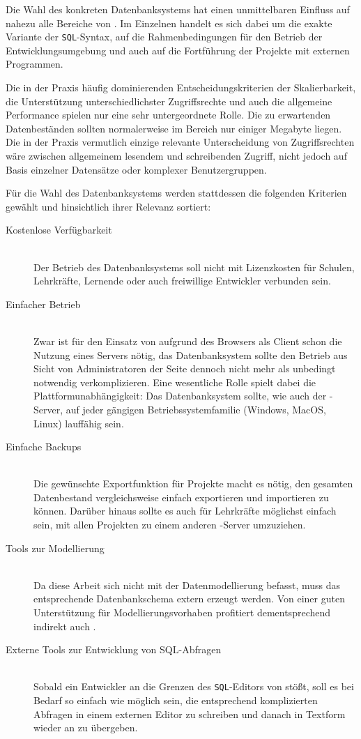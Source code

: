Die Wahl des konkreten Datenbanksystems hat einen unmittelbaren Einfluss auf nahezu alle Bereiche von \idename. Im Einzelnen handelt es sich dabei um die exakte Variante der \texttt{SQL}-Syntax, auf die Rahmenbedingungen für den Betrieb der Entwicklungsumgebung und auch auf die Fortführung der Projekte mit externen Programmen.

Die in der Praxis häufig dominierenden Entscheidungskriterien der Skalierbarkeit, die Unterstützung unterschiedlichster Zugriffsrechte und auch die allgemeine Performance spielen nur eine sehr untergeordnete Rolle. Die zu erwartenden Datenbeständen sollten normalerweise im Bereich nur einiger Megabyte liegen. Die in der Praxis vermutlich einzige relevante Unterscheidung von Zugriffsrechten wäre zwischen allgemeinem lesendem und schreibenden Zugriff, nicht jedoch auf Basis einzelner Datensätze oder komplexer Benutzergruppen.

Für die Wahl des Datenbanksystems werden stattdessen die folgenden Kriterien gewählt und hinsichtlich ihrer Relevanz sortiert:

\begin{description}  
\item[Kostenlose Verfügbarkeit] \hfill \\
  Der Betrieb des Datenbanksystems soll nicht mit Lizenzkosten für Schulen, Lehrkräfte, Lernende oder auch freiwillige Entwickler verbunden sein.
\item[Einfacher Betrieb] \hfill \\
  Zwar ist für den Einsatz von \idename{} aufgrund des Browsers als Client schon die Nutzung eines Servers nötig, das Datenbanksystem sollte den Betrieb aus Sicht von Administratoren der Seite dennoch nicht mehr als unbedingt notwendig verkomplizieren. Eine wesentliche Rolle spielt dabei die Plattformunabhängigkeit: Das Datenbanksystem sollte, wie auch der \idename{}-Server, auf jeder gängigen Betriebssystemfamilie (Windows, MacOS, Linux) lauffähig sein.
\item[Einfache Backups] \hfill \\
  Die gewünschte Exportfunktion für Projekte macht es nötig, den gesamten Datenbestand vergleichsweise einfach exportieren und importieren zu können. Darüber hinaus sollte es auch für Lehrkräfte möglichst einfach sein, mit allen Projekten zu einem anderen \idename{}-Server umzuziehen.
\item[Tools zur Modellierung] \hfill \\
  Da diese Arbeit sich nicht mit der Datenmodellierung befasst, muss das entsprechende Datenbankschema extern erzeugt werden. Von einer guten Unterstützung für Modellierungsvorhaben profitiert dementsprechend indirekt auch \idename.
\item[Externe Tools zur Entwicklung von SQL-Abfragen] \hfill \\
  Sobald ein Entwickler an die Grenzen des \texttt{SQL}-Editors von \idename{} stößt, soll es bei Bedarf so einfach wie möglich sein, die entsprechend komplizierten Abfragen in einem externen Editor zu schreiben und danach in Textform wieder an \idename{} zu übergeben.
\end{description}

